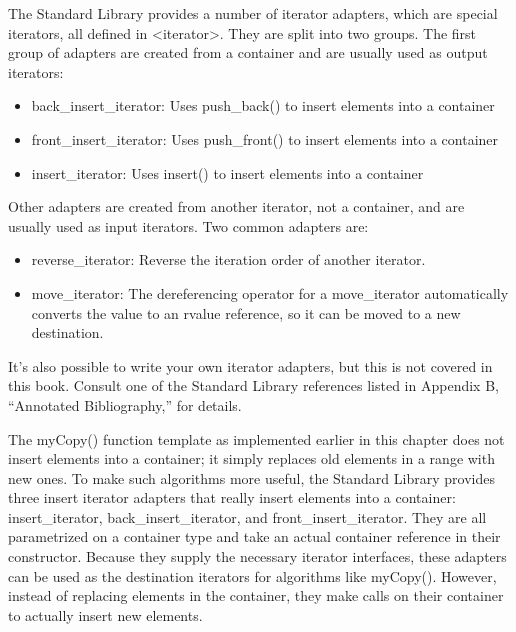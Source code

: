 
The Standard Library provides a number of iterator adapters, which are special iterators, all defined in <iterator>. They are split into two groups. The first group of adapters are created from a container and are usually used as output iterators:

\begin{itemize}
\item
back\_insert\_iterator: Uses push\_back() to insert elements into a container

\item
front\_insert\_iterator: Uses push\_front() to insert elements into a container

\item
insert\_iterator: Uses insert() to insert elements into a container
\end{itemize}

Other adapters are created from another iterator, not a container, and are usually used as input iterators. Two common adapters are:

\begin{itemize}
\item
reverse\_iterator: Reverse the iteration order of another iterator.

\item
move\_iterator: The dereferencing operator for a move\_iterator automatically converts the value to an rvalue reference, so it can be moved to a new destination.
\end{itemize}

It’s also possible to write your own iterator adapters, but this is not covered in this book. Consult one of the Standard Library references listed in Appendix B, “Annotated Bibliography,” for details.


The myCopy() function template as implemented earlier in this chapter does not insert elements into a container; it simply replaces old elements in a range with new ones. To make such algorithms more useful, the Standard Library provides three insert iterator adapters that really insert elements into a container: insert\_iterator, back\_insert\_iterator, and front\_insert\_iterator. They are all parametrized on a container type and take an actual container reference in their constructor. Because they supply the necessary iterator interfaces, these adapters can be used as the destination iterators for algorithms like myCopy(). However, instead of replacing elements in the container, they make calls on their container to actually insert new elements.


